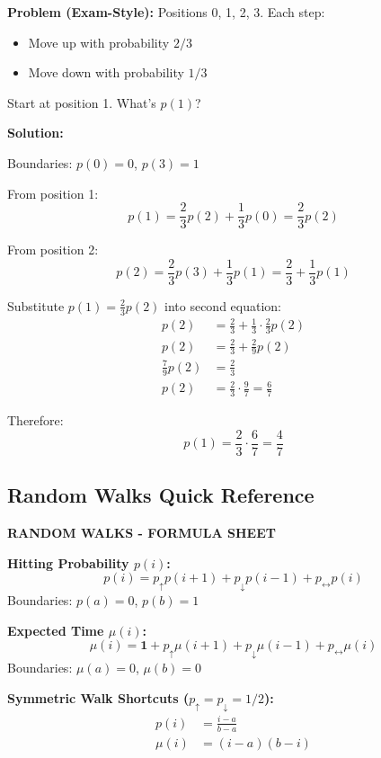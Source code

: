 \documentclass[10pt,letterpaper]{article}
\begin{document}
\begin{examplebox}
\textbf{Problem (Exam-Style):} Positions 0, 1, 2, 3. Each step:
\begin{itemize}
  \item Move up with probability $2/3$
  \item Move down with probability $1/3$
\end{itemize}

Start at position 1. What's $p(1)$?

\textbf{Solution:}

Boundaries: $p(0) = 0$, $p(3) = 1$

From position 1:
\[
p(1) = \frac{2}{3}p(2) + \frac{1}{3}p(0) = \frac{2}{3}p(2)
\]

From position 2:
\[
p(2) = \frac{2}{3}p(3) + \frac{1}{3}p(1) = \frac{2}{3} + \frac{1}{3}p(1)
\]

Substitute $p(1) = \frac{2}{3}p(2)$ into second equation:
\begin{align*}
p(2) &= \frac{2}{3} + \frac{1}{3} \cdot \frac{2}{3}p(2) \\
p(2) &= \frac{2}{3} + \frac{2}{9}p(2) \\
\frac{7}{9}p(2) &= \frac{2}{3} \\
p(2) &= \frac{2}{3} \cdot \frac{9}{7} = \frac{6}{7}
\end{align*}

Therefore:
\[
p(1) = \frac{2}{3} \cdot \frac{6}{7} = \boxed{\frac{4}{7}}
\]
\end{examplebox}

\subsection{Random Walks Quick Reference}

\begin{formulabox}
\textbf{RANDOM WALKS - FORMULA SHEET}

\vspace{0.2cm}

\textbf{Hitting Probability $p(i)$:}
\[
p(i) = p_{\uparrow} p(i+1) + p_{\downarrow} p(i-1) + p_{\leftrightarrow} p(i)
\]
Boundaries: $p(a) = 0$, $p(b) = 1$

\textbf{Expected Time $\mu(i)$:}
\[
\mu(i) = \mathbf{1} + p_{\uparrow} \mu(i+1) + p_{\downarrow} \mu(i-1) + p_{\leftrightarrow} \mu(i)
\]
Boundaries: $\mu(a) = 0$, $\mu(b) = 0$

\vspace{0.2cm}

\textbf{Symmetric Walk Shortcuts ($p_{\uparrow} = p_{\downarrow} = 1/2$):}
\begin{align*}
p(i) &= \frac{i-a}{b-a} \\
\mu(i) &= (i-a)(b-i)
\end{align*}
\end{formulabox}
\end{document}
